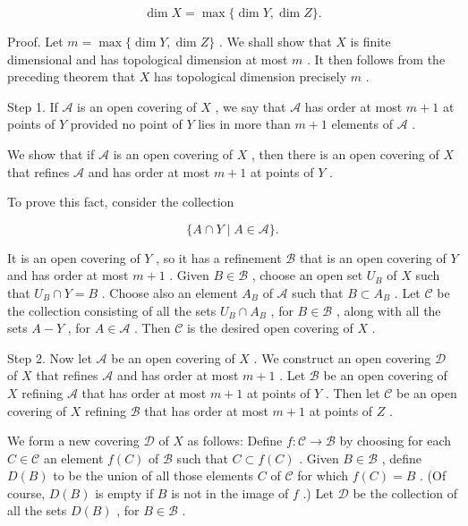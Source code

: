 \documentclass[10pt]{article}
\begin{document}
\[
\dim X = \max \{ \dim Y,\dim Z\} .
\]

Proof. Let \(m = \max \{ \dim Y,\dim Z\}\) . We shall show that \(X\) is finite dimensional and has topological dimension at most \(m\) . It then follows from the preceding theorem that \(X\) has topological dimension precisely \(m\) .

Step 1. If \(\mathcal{A}\) is an open covering of \(X\) , we say that \(\mathcal{A}\) has order at most \(m + 1\) at points of \(Y\) provided no point of \(Y\) lies in more than \(m + 1\) elements of \(\mathcal{A}\) .

We show that if \(\mathcal{A}\) is an open covering of \(X\) , then there is an open covering of \(X\) that refines \(\mathcal{A}\) and has order at most \(m + 1\) at points of \(Y\) .

To prove this fact, consider the collection

\[
\{ A \cap  Y \mid  A \in  \mathcal{A}\} .
\]

It is an open covering of \(Y\) , so it has a refinement \(\mathcal{B}\) that is an open covering of \(Y\) and has order at most \(m + 1\) . Given \(B \in  \mathcal{B}\) , choose an open set \({U}_{B}\) of \(X\) such that \({U}_{B} \cap  Y = B\) . Choose also an element \({A}_{B}\) of \(\mathcal{A}\) such that \(B \subset  {A}_{B}\) . Let \(\mathcal{C}\) be the collection consisting of all the sets \({U}_{B} \cap  {A}_{B}\) , for \(B \in  \mathcal{B}\) , along with all the sets \(A - Y\) , for \(A \in  \mathcal{A}\) . Then \(\mathcal{C}\) is the desired open covering of \(X\) .

Step 2. Now let \(\mathcal{A}\) be an open covering of \(X\) . We construct an open covering \(\mathcal{D}\) of \(X\) that refines \(\mathcal{A}\) and has order at most \(m + 1\) . Let \(\mathcal{B}\) be an open covering of \(X\) refining \(\mathcal{A}\) that has order at most \(m + 1\) at points of \(Y\) . Then let \(\mathcal{C}\) be an open covering of \(X\) refining \(\mathcal{B}\) that has order at most \(m + 1\) at points of \(Z\) .

We form a new covering \(\mathcal{D}\) of \(X\) as follows: Define \(f : \mathcal{C} \rightarrow  \mathcal{B}\) by choosing for each \(C \in  \mathcal{C}\) an element \(f\left( C\right)\) of \(\mathcal{B}\) such that \(C \subset  f\left( C\right)\) . Given \(B \in  \mathcal{B}\) , define \(D\left( B\right)\) to be the union of all those elements \(C\) of \(\mathcal{C}\) for which \(f\left( C\right)  = B\) . (Of course, \(D\left( B\right)\) is empty if \(B\) is not in the image of \(f\) .) Let \(\mathcal{D}\) be the collection of all the sets \(D\left( B\right)\) , for \(B \in  \mathcal{B}\) .
\end{document}

